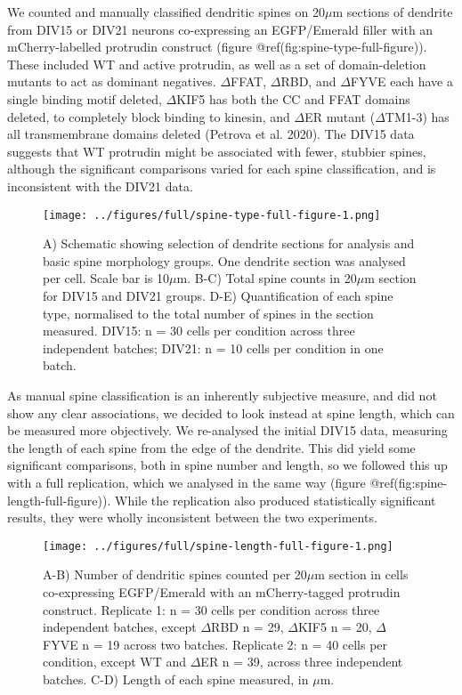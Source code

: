 \documentclass[
]{article}
\begin{document}
We counted and manually classified dendritic spines on 20\(\mu\)m
sections of dendrite from DIV15 or DIV21 neurons co-expressing an
EGFP/Emerald filler with an mCherry-labelled protrudin construct (figure
@ref(fig:spine-type-full-figure)). These included WT and active
protrudin, as well as a set of domain-deletion mutants to act as
dominant negatives. \(\Delta\)FFAT, \(\Delta\)RBD, and \(\Delta\)FYVE
each have a single binding motif deleted, \(\Delta\)KIF5 has both the CC
and FFAT domains deleted, to completely block binding to kinesin, and
\(\Delta\)ER mutant (\(\Delta\)TM1-3) has all transmembrane domains
deleted (Petrova et al. 2020). The DIV15 data suggests that WT protrudin
might be associated with fewer, stubbier spines, although the
significant comparisons varied for each spine classification, and is
inconsistent with the DIV21 data.


\begin{figure}
\centering
\texttt{[image: ../figures/full/spine-type-full-figure-1.png]}
\caption{A) Schematic showing selection of dendrite sections for
analysis and basic spine morphology groups. One dendrite section was
analysed per cell. Scale bar is 10\(\mu\)m. B-C) Total spine counts in
20\(\mu\)m section for DIV15 and DIV21 groups. D-E) Quantification of
each spine type, normalised to the total number of spines in the section
measured. DIV15: n = 30 cells per condition across three independent
batches; DIV21: n = 10 cells per condition in one batch.}
\end{figure}


As manual spine classification is an inherently subjective measure, and
did not show any clear associations, we decided to look instead at spine
length, which can be measured more objectively. We re-analysed the
initial DIV15 data, measuring the length of each spine from the edge of
the dendrite. This did yield some significant comparisons, both in spine
number and length, so we followed this up with a full replication, which
we analysed in the same way (figure @ref(fig:spine-length-full-figure)).
While the replication also produced statistically significant results,
they were wholly inconsistent between the two experiments.

\begin{figure}
\centering
\texttt{[image: ../figures/full/spine-length-full-figure-1.png]}
\caption{A-B) Number of dendritic spines counted per 20\(\mu\)m section
in cells co-expressing EGFP/Emerald with an mCherry-tagged protrudin
construct. Replicate 1: n = 30 cells per condition across three
independent batches, except \(\Delta\)RBD n = 29, \(\Delta\)KIF5 n = 20,
\(\Delta\)FYVE n = 19 across two batches. Replicate 2: n = 40 cells per
condition, except WT and \(\Delta\)ER n = 39, across three independent
batches. C-D) Length of each spine measured, in \(\mu\)m.}
\end{figure}
\end{document}
